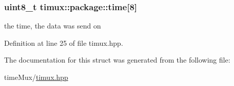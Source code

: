 \hypertarget{structtimux_1_1package_a201dd7d030a9950d5e36481668597c24}{
\subsubsection[{time}]{\setlength{\rightskip}{0pt plus 5cm}uint8\+\_\+t timux\+::package\+::time\mbox{[}8\mbox{]}}}\label{structtimux_1_1package_a201dd7d030a9950d5e36481668597c24}


the time, the data was send on 



Definition at line 25 of file timux.\+hpp.



The documentation for this struct was generated from the following file\+:\begin{DoxyCompactItemize}
\item 
time\+Mux/\hyperlink{timux_8hpp}{timux.\+hpp}\end{DoxyCompactItemize}
